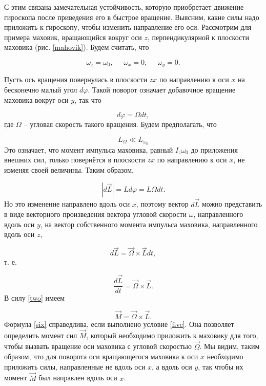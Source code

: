 \documentclass[a4paper,12pt]{article} %
\begin{document}
С этим связана замечательная устойчивость, которую приобретает движение гироскопа после приведения его в быстрое вращение. 
Выясним, какие силы надо приложить к гироскопу, чтобы изменить 
направление его оси. Рассмотрим для 
примера маховик, вращающийся вокруг оси $ z $, перпендикулярной к плоскости маховика (рис. \ref{mahovik}). Будем считать, что

\begin{equation}
\omega_z = \omega_0, \;\;\;\;\; \omega_x = 0, \;\;\;\;\; \omega_y = 0.
\end{equation}

\noindent Пусть ось вращения повернулась в плоскости $ zx $ по направлению к оси $ x $ на бесконечно малый угол $ d\varphi $. Такой поворот означает добавочное вращение маховика вокруг оси $ y $, так что

\begin{equation}
d\varphi=\Omega dt,
\end{equation}
где $ \Omega $ -- угловая скорость такого вращения. Будем предполагать, что

\begin{equation}
L_\Omega \ll L_{\omega_0}
\label{five}
\end{equation}
Это означает, что момент импульса маховика, равный $ I_z\omega_0 $ до приложения внешних сил, только повернётся в плоскости $ zx $ по направлению к оси $ x $, не изменяя своей величины. Таким образом, 

\begin{equation}
\left|d\vec{L}\right| = Ld\varphi = L\Omega dt.
\end{equation}
Но это изменение направлено вдоль оси $ x $, поэтому вектор $ d\vec{L} $ можно представить в виде векторного произведения вектора угловой скорости $ \omega $, направленного вдоль оси $ y $, на вектор собственного момента импульса маховика, направленного вдоль оси $ z $,

\begin{equation}
d\vec{L}=\vec{\Omega} \times \vec{L} dt,
\end{equation}
т. е.

\begin{equation}
\frac{d\vec{L}}{dt} = \vec{\Omega} \times \vec{L}.
\end{equation}
В силу \eqref{two} имеем

\begin{equation}
\vec{M} = \vec{\Omega} \times \vec{L}.
\label{six}
\end{equation}
Формула \eqref{six} справедлива, если выполнено условие \eqref{five}. Она позволяет определить момент сил $ \vec{M} $, который необходимо приложить к маховику для того, чтобы вызвать вращение оси маховика с угловой скоростью $ \vec{\Omega} $. Мы видим, таким образом, что для поворота оси вращающегося маховика к оси $ x $ необходимо приложить силы, направленные не вдоль оси $ x $, а вдоль оси $ y $, так чтобы их момент $ \vec{M} $ был направлен вдоль оси $ x $.
\end{document}

